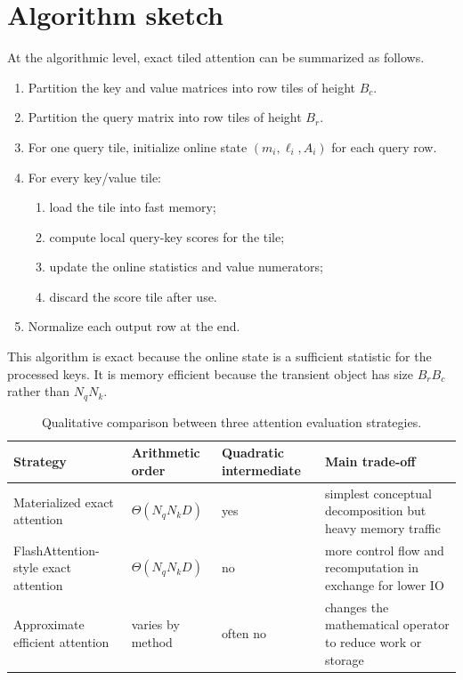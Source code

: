 \section{Algorithm sketch}

At the algorithmic level, exact tiled attention can be summarized as follows.

\begin{enumerate}
  \item Partition the key and value matrices into row tiles of height $B_c$.
  \item Partition the query matrix into row tiles of height $B_r$.
  \item For one query tile, initialize online state $(m_i,\ell_i,A_i)$ for each query row.
  \item For every key/value tile:
  \begin{enumerate}
    \item load the tile into fast memory;
    \item compute local query-key scores for the tile;
    \item update the online statistics and value numerators;
    \item discard the score tile after use.
  \end{enumerate}
  \item Normalize each output row at the end.
\end{enumerate}

This algorithm is exact because the online state is a sufficient statistic for the processed keys. It is memory efficient because the transient object has size $B_r B_c$ rather than $N_q N_k$.

\begin{table}[htbp]
\centering
\caption{Qualitative comparison between three attention evaluation strategies.}
\label{tab:attention-strategies}
\begin{tabularx}{\textwidth}{@{}p{} p{} p{} X@{}}
\toprule
Strategy & Arithmetic order & Quadratic intermediate & Main trade-off \\
\midrule
Materialized exact attention & $\Theta(N_qN_kD)$ & yes & simplest conceptual decomposition but heavy memory traffic \\
FlashAttention-style exact attention & $\Theta(N_qN_kD)$ & no & more control flow and recomputation in exchange for lower IO \\
Approximate efficient attention & varies by method & often no & changes the mathematical operator to reduce work or storage \\
\bottomrule
\end{tabularx}
\end{table}

